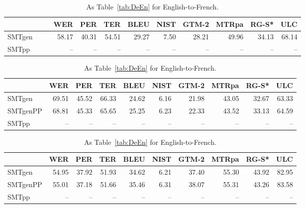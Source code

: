 \documentclass[a4paper,11pt]{article}
\begin{document}
\begin{table}[t]
\small
{}
\begin{tabular}{lrrrrrrrrr}
\toprule
         & WER   &  PER  & TER   &  BLEU & NIST & GTM-2 & MTRpa & RG-S* & ULC \\
\midrule
SMTgen~~~~ & 58.17 & 40.31 & 54.51 & 29.27 & 7.50 & 28.21 & 49.96 & 34.13 & 68.14 \\  
SMTpp    &   --  &   --  &   --  &   --  &  --  &   --  &   --  &   --  &   --  \\
\bottomrule
\end{tabular}

\begin{tabular}{lrrrrrrrrr}
\toprule
         & WER   &  PER  & TER   &  BLEU & NIST & GTM-2 & MTRpa & RG-S* & ULC \\
\midrule
SMTgen	 & 69.51 & 45.52 & 66.33 & 24.62 & 6.16 & 21.98 & 43.05 & 32.67 & 63.33 \\  
SMTgenPP & 68.81 & 45.33 & 65.65 & 25.25 & 6.23 & 22.33 & 43.52 & 33.13 & 64.59 \\  
SMTpp    &   --  &   --  &   --  &   --  &  --  &   --  &   --  &   --  &   --  \\
\bottomrule
\end{tabular}

\begin{tabular}{lrrrrrrrrr}
\toprule
         & WER   &  PER  & TER   &  BLEU & NIST & GTM-2 & MTRpa & RG-S* & ULC \\
\midrule
SMTgen	 & 54.95 & 37.92 & 51.93 & 34.62 & 6.21 & 37.40 & 55.30 & 43.92 & 82.95 \\  
SMTgenPP & 55.01 & 37.18 & 51.66 & 35.46 & 6.31 & 38.07 & 55.31 & 43.26 & 83.58 \\  
SMTpp    &   --  &   --  &   --  &   --  &  --  &   --  &   --  &   --  &   --  \\
\bottomrule
\end{tabular}
 \caption{As Table~\ref{tab:DeEn} for English-to-French.}
 \label{tab:EnFr}
\end{table}
\end{document}
